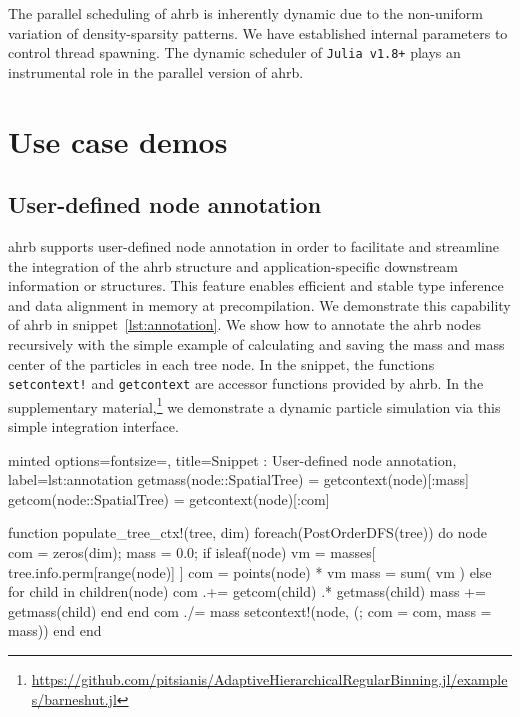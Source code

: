 \documentclass[final]{juliacon}
\begin{document}
The parallel scheduling of {\sc ahrb} is inherently dynamic due to the
non-uniform variation of density-sparsity patterns. We have established internal
parameters to control thread spawning. The dynamic scheduler of \texttt{Julia
v1.8+} plays an instrumental role in the parallel version of {\sc ahrb}.


%
%
%
 


\section{Use case demos}
\label{sec:use-cases}

%
%
%
%

%
%

\subsection{User-defined node annotation}
\label{sec:nbody-simulation}

%
%
%
%
%
%
%
%

{\sc ahrb} supports user-defined node annotation in order to facilitate and
streamline the integration of the {\sc ahrb} structure and application-specific
downstream information or structures. This feature enables efficient and stable
type inference and data alignment in memory at precompilation.
%
We demonstrate this capability of {\sc ahrb} in snippet~\ref{lst:annotation}. We
show how to annotate the {\sc ahrb} nodes recursively with the simple example of
calculating and saving the mass and mass center of the particles in each tree
node. In the snippet, the functions {\tt setcontext!} and {\tt getcontext} are
accessor functions provided by {\sc ahrb}. In the supplementary
material,\footnote{\scriptsize \href{https://github.com/pitsianis/AdaptiveHierarchicalRegularBinning.jl/examples/barneshut.jl}{https://github.com/pitsianis/AdaptiveHierarchicalRegularBinning.jl/examples/barneshut.jl}}
we demonstrate a dynamic particle simulation via this simple integration
interface.


\begin{myjulia}{%
    minted options={fontsize=\footnotesize},
    title={Snippet \thetcbcounter: User-defined node annotation},
    label=lst:annotation}
getmass(node::SpatialTree) = getcontext(node)[:mass]
getcom(node::SpatialTree)  = getcontext(node)[:com]

function populate_tree_ctx!(tree, dim)
  foreach(PostOrderDFS(tree)) do node
    com = zeros(dim); mass = 0.0;
    if isleaf(node)
      vm = masses[ tree.info.perm[range(node)] ]
      com  = points(node) * vm
      mass = sum( vm )    
    else
      for child in children(node)
        com .+= getcom(child) .* getmass(child)
        mass += getmass(child)
      end
    end
    com ./= mass
    setcontext!(node, (; com = com, mass = mass))
  end
end
\end{myjulia}  
\end{document}

